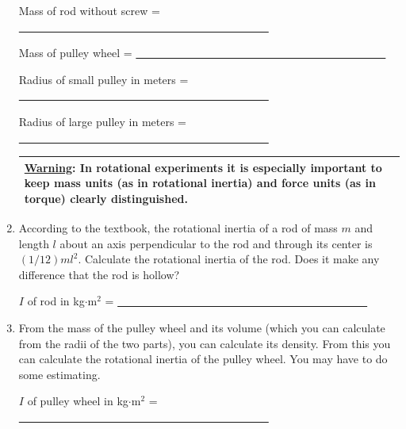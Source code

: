 \begin{enumerate}[label=\arabic*.]
Mass of rod without screw = \ul{~~~~~~~~~~~~~~~~~~~~~~~~~~~~~~~~~~~~~~~~~~~~~}

Mass of pulley wheel = \ul{~~~~~~~~~~~~~~~~~~~~~~~~~~~~~~~~~~~~~~~~~~~~~}

Radius of small pulley in meters = \ul{~~~~~~~~~~~~~~~~~~~~~~~~~~~~~~~~~~~~~~~~~~~~~}

Radius of large pulley in meters = \ul{~~~~~~~~~~~~~~~~~~~~~~~~~~~~~~~~~~~~~~~~~~~~~}

\begin{center}
\begin{tabular}{|p{14cm}|}
\hline\tstrut
\ul{Warning}: In rotational experiments it is especially important to keep mass units (as in rotational inertia) and force units (as in torque) clearly distinguished.  \bstrut\\
\hline
\end{tabular}
\end{center}

\item According to the textbook, the rotational inertia of a rod of mass \(m\) and length \(l\) about an axis perpendicular to the rod and through its center is \((1/12)ml^2\).  Calculate the rotational inertia of the rod.  Does it make any difference that the rod is hollow?

\(I\) of rod in kg\(\cdot\)m\(^{2}\) = \ul{~~~~~~~~~~~~~~~~~~~~~~~~~~~~~~~~~~~~~~~~~~~~~}

\item From the mass of the pulley wheel and its volume (which you can calculate from the radii of the two parts), you can calculate its density.  From this you can calculate the rotational inertia of the pulley wheel.  You may have to do some estimating.

\(I\) of pulley wheel in kg\(\cdot\)m\(^{2}\) = \ul{~~~~~~~~~~~~~~~~~~~~~~~~~~~~~~~~~~~~~~~~~~~~~}


\end{enumerate}
